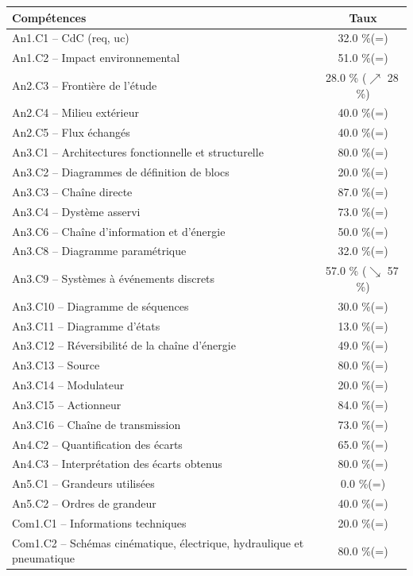 \footnotesize 
\begin{center} 
\begin{tabular}{|p{.7\linewidth}|c|} 
\hline 
Compétences  & Taux \\ \hline \hline 
An1.C1 -- CdC (req, uc)&32.0 \%(=)\\ \hline 
An1.C2 -- Impact environnemental&51.0 \%(=)\\ \hline 
An2.C3 -- Frontière de l’étude&28.0 \% ($\nearrow$ 28\,\%)\\ \hline 
An2.C4 -- Milieu extérieur&40.0 \%(=)\\ \hline 
An2.C5 -- Flux échangés&40.0 \%(=)\\ \hline 
An3.C1 -- Architectures fonctionnelle et structurelle&80.0 \%(=)\\ \hline 
An3.C2 -- Diagrammes de définition de blocs&20.0 \%(=)\\ \hline 
An3.C3 -- Chaîne directe&87.0 \%(=)\\ \hline 
An3.C4 -- Dystème asservi&73.0 \%(=)\\ \hline 
An3.C6 -- Chaîne d’information et d'énergie&50.0 \%(=)\\ \hline 
An3.C8 -- Diagramme paramétrique&32.0 \%(=)\\ \hline 
An3.C9 -- Systèmes à événements discrets&57.0 \% ($\searrow$ 57\,\%)\\ \hline 
An3.C10 -- Diagramme de séquences&30.0 \%(=)\\ \hline 
An3.C11 -- Diagramme d’états&13.0 \%(=)\\ \hline 
An3.C12 -- Réversibilité de la chaîne d’énergie&49.0 \%(=)\\ \hline 
An3.C13 -- Source&80.0 \%(=)\\ \hline 
An3.C14 -- Modulateur&20.0 \%(=)\\ \hline 
An3.C15 -- Actionneur&84.0 \%(=)\\ \hline 
An3.C16 -- Chaîne de transmission&73.0 \%(=)\\ \hline 
An4.C2 -- Quantification des écarts&65.0 \%(=)\\ \hline 
An4.C3 -- Interprétation des écarts obtenus&80.0 \%(=)\\ \hline 
An5.C1 -- Grandeurs utilisées &0.0 \%(=)\\ \hline 
An5.C2 -- Ordres de grandeur&40.0 \%(=)\\ \hline 
Com1.C1 -- Informations techniques&20.0 \%(=)\\ \hline 
Com1.C2 -- Schémas cinématique, électrique, hydraulique et pneumatique&80.0 \%(=)\\ \hline 

\end{tabular}
\end{center}
